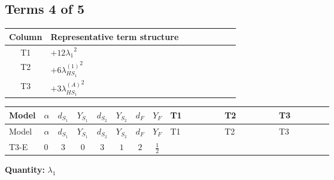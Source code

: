\documentclass[8pt]{article}
\begin{document}
\begin{landscape}
\subsection*{Terms 4 of 5}
\begin{center}
\begin{tabular}{@{}c >{\raggedright\arraybackslash}p{0.82\linewidth}@{}}
\toprule
Column & Representative term structure \\
\midrule
T1 & \(\displaystyle +12 {\lambda_1}^2\) \\
\midrule
T2 & \(\displaystyle +6 {\lambda_{HS_1}^{(1)}}^2\) \\
\midrule
T3 & \(\displaystyle +3 {\lambda_{HS_1}^{(A)}}^2\) \\
\midrule
\bottomrule
\end{tabular}
\end{center}
\smallskip
\tiny
\begin{longtable}{@{}llcccccc >{\raggedright\arraybackslash}p{0.21\linewidth} >{\raggedright\arraybackslash}p{0.21\linewidth} >{\raggedright\arraybackslash}p{0.21\linewidth}@{}}
\toprule
Model & $\alpha$ & $d_{S_1}$ & $Y_{S_1}$ & $d_{S_2}$ & $Y_{S_2}$ & $d_F$ & $Y_F$ & T1 & T2 & T3 \\
\midrule
\endfirsthead
\toprule
Model & $\alpha$ & $d_{S_1}$ & $Y_{S_1}$ & $d_{S_2}$ & $Y_{S_2}$ & $d_F$ & $Y_F$ & T1 & T2 & T3 \\
\midrule
\endhead
T3-E & $0$ & $3$ & $0$ & $3$ & $1$ & $2$ & $\frac{1}{2}$ & \scriptsize\adjustbox{max width=\linewidth}{$\begin{gathered} +12 {\lambda_1}^2\end{gathered}$} & \scriptsize\adjustbox{max width=\linewidth}{$\begin{gathered} +6 {\lambda_{HS_1}^{(1)}}^2\end{gathered}$} & \scriptsize\adjustbox{max width=\linewidth}{$\begin{gathered} +3 {\lambda_{HS_1}^{(A)}}^2\end{gathered}$} \\
\midrule
\bottomrule
\end{longtable}
\clearpage
\noindent\textbf{Quantity: }$\lambda_1$\par\smallskip

\end{landscape}
\end{document}
